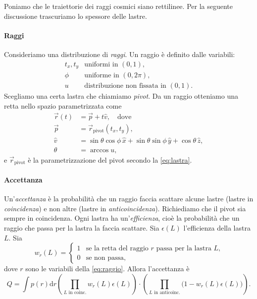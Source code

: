 Poniamo che le traiettorie dei raggi cosmici siano rettilinee.
Per la seguente discussione trascuriamo lo spessore delle lastre.

\paragraph{Raggi}

Consideriamo una distribuzione di \emph{raggi}.
Un raggio è definito dalle variabili:
\begin{equation}
	\label{eq:raggio}
	\begin{array}{ll}
		t_x, t_y & \text{uniformi in $(0,1)$}, \\
		\phi     & \text{uniforme in $(0,2\pi)$}, \\
		u        & \text{distribuzione non fissata in $(0,1)$}.
	\end{array}
\end{equation}
Scegliamo una certa lastra che chiamiamo \emph{pivot}.
Da un raggio otteniamo una retta nello spazio parametrizzata come
\begin{align*}
	\vec r(t) &= \vec p + t \hat v, \quad \text{dove} \\
	\vec p    &= \vec r_\text{pivot}(t_x, t_y), \\
	\hat v    &= \sin\theta\cos\phi\,\hat x + \sin\theta\sin\phi\,\hat y + \cos\theta\,\hat z, \\
	\theta    &= \arccos u,
\end{align*}
e $\vec r_\text{pivot}$ è la parametrizzazione del pivot secondo la \eqref{eq:lastra}.

\paragraph{Accettanza}

Un'\emph{accettanza} è la probabilità che un raggio
faccia scattare alcune lastre (lastre in \emph{coincidenza})
e non altre (lastre in \emph{anticoincidenza}).
Richiediamo che il pivot sia sempre in coincidenza.
Ogni lastra ha un'\emph{efficienza},
cioè la probabilità che un raggio che passa per la lastra la faccia scattare.
Sia $\epsilon(L)$ l'efficienza della lastra $L$.
Sia
\begin{equation*}
	w_r(L) = \begin{cases}
		1 & \text{se la retta del raggio $r$ passa per la lastra $L$,} \\
		0 & \text{se non passa,}
	\end{cases}
\end{equation*}
dove $r$ sono le variabili della \eqref{eq:raggio}.
Allora l'accettanza è
\begin{equation}
	\label{eq:acc}
	Q = \int p(r) \mathrm{d} r
	\left( \prod_\text{$L$ in coinc.} w_r(L) \epsilon(L) \right)
	\cdot \left( \prod_\text{$L$ in anticoinc.} \big(1 - w_r(L) \epsilon(L)\big) \right).
\end{equation}

